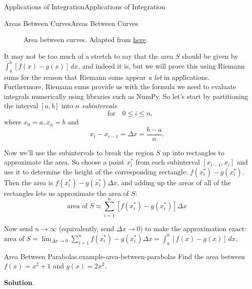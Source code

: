 \documentclass[10pt,]{book}
\numberwithin{equation}{section}
\begin{document}
\begin{chapterptx}{Applications of Integration}{}{Applications of Integration}{}{}
\begin{sectionptx}{Areas Between Curves}{}{Areas Between Curves}{}{}
\begin{figure}
{
}
\caption{Area between curves. Adapted from \href{https://tex.stackexchange.com/questions/164773/graphics-area-between-curves}{here}.\label{figure-area-between-curves}}
\end{figure}
\hypertarget{p-614}{}%
It may not be too much of a stretch to say that the area \(S\) should be given by \(\int_{a}^{b}[f(x) - g(x)]\,dx\), and indeed it is, but we will prove this using Riemann sums for the reason that Riemann sums appear \emph{a lot} in applications. Furthermore, Riemann sums provide us with the formula we need to evaluate integrals numerically using libraries such as NumPy. So let's start by partitioning the interval \([a,b]\) into \(n\) \emph{subintervals}%
\begin{equation*}
[x_{i-1},x_{i}]\quad\text{for}\quad 0\leq i\leq n,
\end{equation*}
where \(x_{0} = a, x_{n} = b\) and%
\begin{equation*}
x_{i} - x_{i-1} = \Delta x = \frac{b-a}{n}.
\end{equation*}
%
\par
\hypertarget{p-615}{}%
Now we'll use the subintervals to break the region \(S\) up into rectangles to approximate the area. So choose a point \(x_{i}^{*}\) from each subinterval \([x_{i-1}, x_{i}]\) and use it to determine the height of the corresponding rectangle: \(f(x_{i}^{*}) - g(x_{i}^{*})\). Then the area is \(f(x_{i}^{*}) - g(x_{i}^{*})\Delta x\), and adding up the areas of all of the rectangles lets us approximate the area of \(S\):%
\begin{equation}
\text{area of }S \approx \sum_{i=1}^{n}[f(x_{i}^{*}) - g(x_{i}^{*})]\Delta x\label{equation-area-between-curves-approximation}
\end{equation}
%
\par
\hypertarget{p-616}{}%
Now send \(n\to\infty\) (equivalently, send \(\Delta x\to 0\)) to make the approximation exact: \(\text{area of }S = \lim_{\Delta x\to0}\sum_{i=1}^{n}f(x_{i}^{*}) - g(x_{i}^{*})\Delta x = \int_{a}^{b}[f(x) - g(x)]\,dx.\)%
\begin{example}{Area Between Parabolas.}{example-area-between-parabolas}%
\hypertarget{p-617}{}%
Find the area between \(f(x) = x^{2} + 1\) and \(g(x) = 2x^{2}\).%
\par\smallskip%
\noindent\textbf{Solution}.\hypertarget{solution-134}{}\quad%

\end{example}
\end{sectionptx}
\end{chapterptx}
\end{document}
